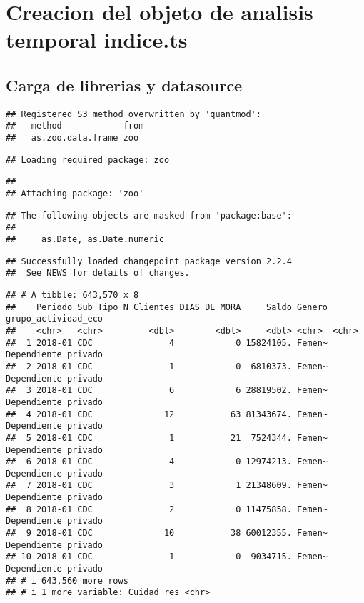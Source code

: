 \documentclass[
]{book}
\begin{document}
\hypertarget{creacion-del-objeto-de-analisis-temporal-indice.ts}{%
\section{Creacion del objeto de analisis temporal indice.ts}\label{creacion-del-objeto-de-analisis-temporal-indice.ts}}

\hypertarget{carga-de-librerias-y-datasource}{%
\subsection{Carga de librerias y datasource}\label{carga-de-librerias-y-datasource}}

\begin{verbatim}
## Registered S3 method overwritten by 'quantmod':
##   method            from
##   as.zoo.data.frame zoo
\end{verbatim}

\begin{verbatim}
## Loading required package: zoo
\end{verbatim}

\begin{verbatim}
## 
## Attaching package: 'zoo'
\end{verbatim}

\begin{verbatim}
## The following objects are masked from 'package:base':
## 
##     as.Date, as.Date.numeric
\end{verbatim}

\begin{verbatim}
## Successfully loaded changepoint package version 2.2.4
##  See NEWS for details of changes.
\end{verbatim}

\begin{verbatim}
## # A tibble: 643,570 x 8
##    Periodo Sub_Tipo N_Clientes DIAS_DE_MORA     Saldo Genero grupo_actividad_eco
##    <chr>   <chr>         <dbl>        <dbl>     <dbl> <chr>  <chr>              
##  1 2018-01 CDC               4            0 15824105. Femen~ Dependiente privado
##  2 2018-01 CDC               1            0  6810373. Femen~ Dependiente privado
##  3 2018-01 CDC               6            6 28819502. Femen~ Dependiente privado
##  4 2018-01 CDC              12           63 81343674. Femen~ Dependiente privado
##  5 2018-01 CDC               1           21  7524344. Femen~ Dependiente privado
##  6 2018-01 CDC               4            0 12974213. Femen~ Dependiente privado
##  7 2018-01 CDC               3            1 21348609. Femen~ Dependiente privado
##  8 2018-01 CDC               2            0 11475858. Femen~ Dependiente privado
##  9 2018-01 CDC              10           38 60012355. Femen~ Dependiente privado
## 10 2018-01 CDC               1            0  9034715. Femen~ Dependiente privado
## # i 643,560 more rows
## # i 1 more variable: Cuidad_res <chr>
\end{verbatim}
\end{document}

